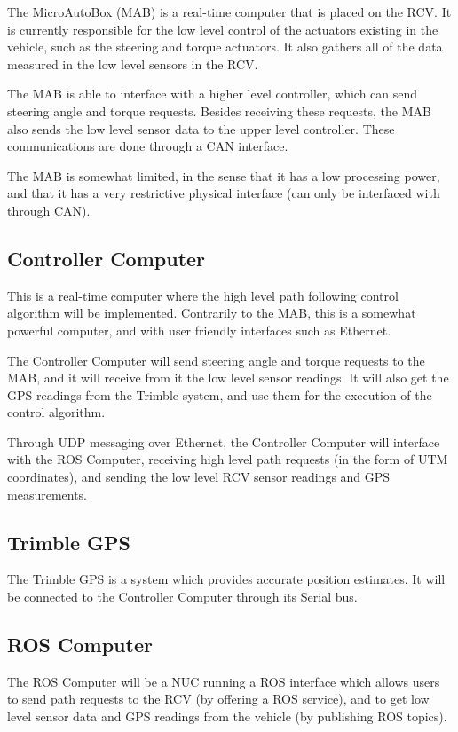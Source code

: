 The MicroAutoBox (MAB) is a real-time computer that is placed on the RCV.
It is currently responsible for the low level control of the actuators existing in the vehicle, such as the steering and torque actuators. It also gathers all of the data measured in the low level sensors in the RCV.

The MAB is able to interface with a higher level controller, which can send steering angle and torque requests. Besides receiving these requests, the MAB also sends the low level sensor data to the upper level controller. These communications are done through a CAN interface.

The MAB is somewhat limited, in the sense that it has a low processing power, and that it has a very restrictive physical interface (can only be interfaced with through CAN).

\subsection{Controller Computer} 

This is a real-time computer where the high level path following control algorithm will be implemented. Contrarily to the MAB, this is a somewhat powerful computer, and with user friendly interfaces such as Ethernet.

The Controller Computer will send steering angle and torque requests to the MAB, and it will receive from it the low level sensor readings.
It will also get the GPS readings from the Trimble system, and use them for the execution of the control algorithm.

Through UDP messaging over Ethernet, the Controller Computer will interface with the ROS Computer, receiving high level path requests (in the form of UTM coordinates), and sending the low level RCV sensor readings and GPS measurements.


\subsection{Trimble GPS}

The Trimble GPS is a system which provides accurate position estimates. It will be connected to the Controller Computer through its Serial bus.

\subsection{ROS Computer}

The ROS Computer will be a NUC running a ROS interface which allows users to send path requests to the RCV (by offering a ROS service), and to get low level sensor data and GPS readings from the vehicle (by publishing ROS topics).


